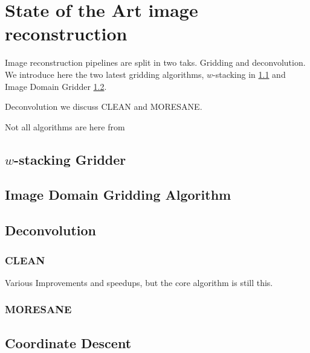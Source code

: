 \section{State of the Art image reconstruction}\label{state}

Image reconstruction pipelines are split in two taks. Gridding and deconvolution. We introduce here the two latest gridding algorithms, $w$-stacking in \ref{state:wstack} and Image Domain Gridder \ref{state:idg}.

Deconvolution we discuss CLEAN and MORESANE.

Not all algorithms are here from

\subsection{$w$-stacking Gridder}\label{state:wstack}

\subsection{Image Domain Gridding Algorithm}\label{state:idg}

\subsection{Deconvolution}

\subsubsection{CLEAN}

Various Improvements and speedups\cite{clark1980efficient, schwab1984relaxing, rau2011multi, offringa2017optimized}, but the core algorithm is still this.

\subsubsection{MORESANE}

\subsection{Coordinate Descent}


